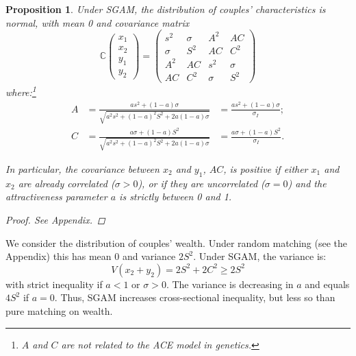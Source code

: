 \documentclass[
  12pt,
]{article}
\newtheorem{proposition}{Proposition}
\theoremstyle{definition}
\theoremstyle{definition}
\theoremstyle{definition}
\theoremstyle{definition}
\theoremstyle{remark}
\begin{document}
\begin{proposition}\label{prop-couples-SGAM}
Under SGAM, the distribution of couples' characteristics is normal, with mean 0
and covariance matrix
\begin{equation}\label{cov-couples-SGAM}
\mathbb{C}\left( 
\begin{array}{c}
x_{1} \\ 
x_{2} \\ 
y_{1} \\ 
y_{2}%
\end{array}%
\right) =\allowbreak \left( 
\begin{array}{cccc}
s^{2} & \sigma  & A^{2} & AC \\ 
\sigma  & S^{2} & AC & C^{2} \\ 
A^{2} & AC & s^{2} & \sigma  \\ 
AC & C^{2} & \sigma  & S^{2}%
\end{array}%
\right) \allowbreak 
\end{equation}
where:\footnote{$A$ and $C$ are not related to the ACE model in genetics.}
\begin{align*}
A &= \frac{as^{2}+\left( 1-a\right) \sigma }{\sqrt{a^{2}s^{2}+\left(
1-a\right) ^{2}S^{2}+2a\left( 1-a\right) \sigma }} &= \frac{as^{2}+\left( 1-a\right) \sigma }{\sigma_I}; \\
C &= \frac{a\sigma +\left( 1-a\right) S^{2}}{\sqrt{a^{2}s^{2}+\left(
1-a\right) ^{2}S^{2}+2a\left( 1-a\right) \sigma }} &= \frac{a\sigma +\left( 1-a\right) S^{2}}{\sigma_I}.
\end{align*}

In particular, the covariance between $x_2$ and $y_1$, $AC$, is positive if
either $x_1$ and $x_2$ are already correlated ($\sigma > 0$), or if they are
uncorrelated ($\sigma = 0$) and the attractiveness parameter $a$ is strictly
between 0 and 1.

\begin{proof}
See Appendix.
\end{proof}
\end{proposition}

We consider the distribution of couples' wealth. Under random matching
(see the Appendix) this has mean \(0\) and variance \(2S^2\). Under SGAM, the variance is:
\[
V(x_{2}+y_{2}) = 2S^{2} + 2C^{2} \ge 2S^{2} 
\]
with strict inequality if \(a < 1\) or \(\sigma > 0\). The variance is decreasing in
\(a\) and equals \(4S^2\) if \(a = 0\). Thus, SGAM increases cross-sectional inequality,
but less so than pure matching on wealth.
\end{document}
